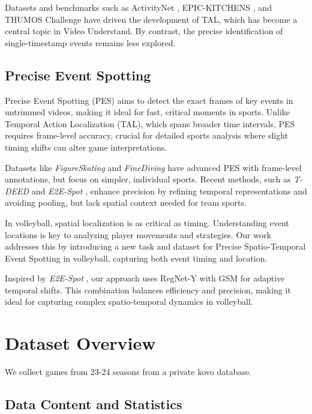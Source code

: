 \documentclass[conference]{IEEEtran}
\begin{document}
Datasets and benchmarks such as ActivityNet \cite{ActivityNet}, EPIC-KITCHENS \cite{damen2018scalingegocentricvisionepickitchens}, and THUMOS Challenge \cite{Idrees_2017} have driven the development of TAL, which has become a central topic in Video Understand. By contrast, the precise identification of single-timestamp events remains less explored.

\subsection{Precise Event Spotting}

Precise Event Spotting (PES) aims to detect the exact frames of key events in untrimmed videos, making it ideal for fast, critical moments in sports. Unlike Temporal Action Localization (TAL), which spans broader time intervals, PES requires frame-level accuracy, crucial for detailed sports analysis where slight timing shifts can alter game interpretations.

Datasets like \textit{FigureSkating} \cite{figureskating} and \textit{FineDiving} \cite{finediving} have advanced PES with frame-level annotations, but focus on simpler, individual sports. Recent methods, such as \textit{T-DEED} \cite{tdeed23} and \textit{E2E-Spot} \cite{spot22}, enhance precision by refining temporal representations and avoiding pooling, but lack spatial context needed for team sports.

In volleyball, spatial localization is as critical as timing. Understanding event locations is key to analyzing player movements and strategies. Our work addresses this by introducing a new task and dataset for Precise Spatio-Temporal Event Spotting in volleyball, capturing both event timing and location.

Inspired by \textit{E2E-Spot} \cite{spot22}, our approach uses RegNet-Y \cite{radosavovic2020designingnetworkdesignspaces} with GSM \cite{9156729} for adaptive temporal shifts. This combination balances efficiency and precision, making it ideal for capturing complex spatio-temporal dynamics in volleyball.

\section{Dataset Overview}
We collect games from 23-24 seasons from a private kovo database.
\subsection{Data Content and Statistics}
\end{document}
